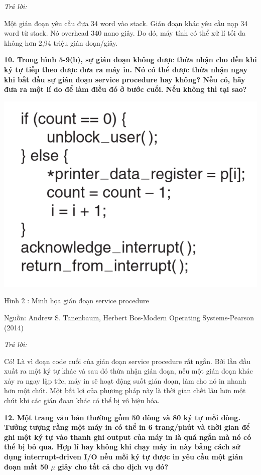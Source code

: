 \documentclass{report}
\begin{document}
\bigskip
\textit{Trả lời:}

\smallskip
Một gián đoạn yêu cầu đưa 34 word vào stack. Gián đoạn khác yêu cầu nạp 34 word từ stack. Nó overhead 340 nano giây. Do đó, máy tính có thể xử lí tối đa không hơn 2,94 triệu gián đoạn/giây.

\bigskip
\textbf{10. Trong hình 5-9(b), sự gián đoạn không được thừa nhận cho đến khi ký tự tiếp theo được đưa ra máy in. Nó có thể được thừa nhận ngay khi bắt đầu sự gián đoạn service procedure hay không? Nếu có, hãy đưa ra một lí do để làm điều đó ở bước cuối. Nếu không thì tại sao?}

\begin{center}
     \includegraphics[scale=0.7]{hinh2}
\end{center}

\centerline{Hình 2 : Minh họa gián đoạn service procedure}
\changefontsizes{12pt}
\centerline{Nguồn: Andrew S. Tanenbaum, Herbert Bos-Modern Operating Systems-Pearson (2014)}
\changefontsizes{13pt}

\bigskip
\textit{Trả lời:}

\smallskip
Có! Là vì đoạn code cuối của gián đoạn service procedure rất ngắn. Bởi lần đầu xuất ra một ký tự khác và sau đó thừa nhận gián đoạn, nếu một gián đoạn khác xảy ra ngay lặp tức, máy in sẽ hoạt động suốt gián đoạn, làm cho nó in nhanh hơn một chút. Một bất lợi của phương pháp này là thời gian chết lâu hơn một chút khi các gián đoạn khác có thể bị vô hiệu hóa.


\bigskip
\textbf{12. Một trang văn bản thường gồm 50 dòng và 80 ký tự mỗi dòng. Tưởng tượng rằng một máy in có thể in 6 trang/phút và thời gian để ghi một ký tự vào thanh ghi output của máy in là quá ngắn mà nó có thể bị bỏ qua. Hợp lí hay không khi chạy máy in này bằng cách sử dụng interrupt-driven I/O nếu mỗi ký tự được in yêu cầu một gián đoạn mất 50 $\mu$ giây cho tất cả cho dịch vụ đó?}
\end{document}
